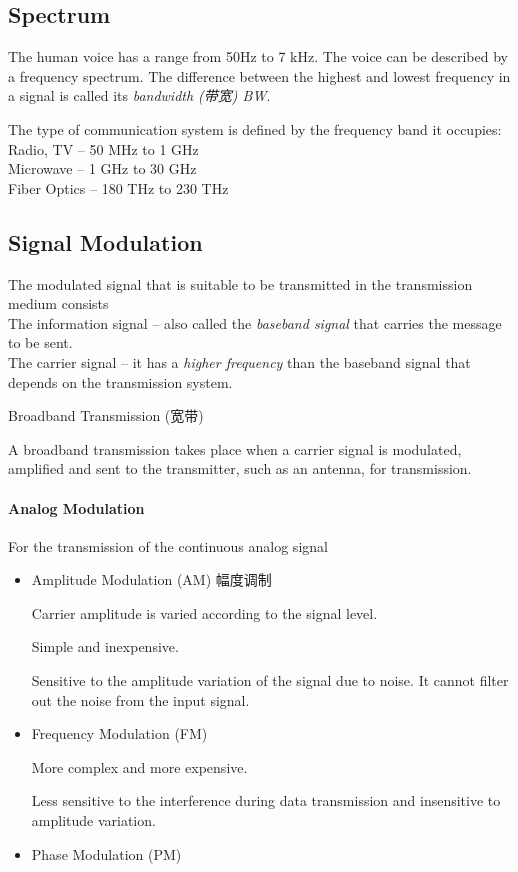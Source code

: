 \documentclass[a4paper,UTF8]{article}
\theoremstyle{mystyle}{
  \newtheorem{law}{Law}
}
\begin{document}
\subsection{Spectrum}
The human voice has a range from 50Hz to 7 kHz.
The voice can be described by a frequency spectrum.
The difference between the highest and lowest frequency in a
signal is called its \emph{bandwidth (带宽) BW}.

The type of communication system is
defined by the frequency band it
occupies:\\
  Radio, TV – 50 MHz to 1 GHz\\
  Microwave – 1 GHz to 30 GHz\\
 Fiber Optics – 180 THz to 230 THz

\subsection{Signal Modulation}
The modulated signal that is suitable to be transmitted in
the transmission medium consists\\
 The information signal – also called the \emph{baseband signal}
that carries the message to be sent.\\
 The carrier signal – it has a \emph{higher frequency} than the
baseband signal that depends on the transmission system.

Broadband Transmission (宽带)

 A broadband transmission takes place when a carrier
signal is modulated, amplified and sent to the transmitter,
such as an antenna, for transmission.

\paragraph{Analog Modulation}
 For the transmission of the continuous analog signal
\begin{itemize}
\item Amplitude Modulation (AM) 幅度调制

Carrier amplitude is varied
according to the signal level.

Simple and inexpensive.

Sensitive to the amplitude
variation of the signal due to
noise. It cannot filter out the
noise from the input signal.

\item Frequency Modulation (FM)

More complex and more
expensive.

Less sensitive to the
interference during data
transmission and insensitive
to amplitude variation.

\item Phase Modulation (PM)

\end{itemize}
\end{document}
